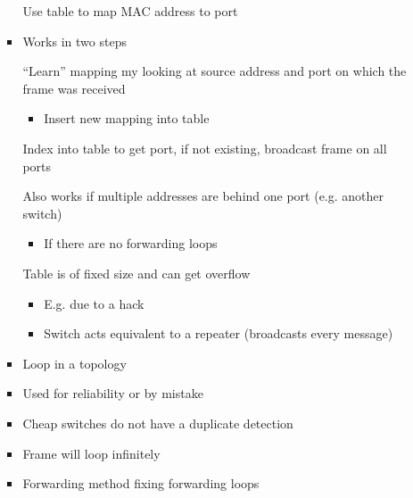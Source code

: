 \begin{itemize}
\begin{itemize}
\begin{itemize}
                     Use table to map MAC address to port
                    \item Works in two steps
                        \begin{itemize}
                             ``Learn'' mapping my looking at source address and port on which the frame was received
                                \begin{itemize}
                                    \item Insert new mapping into table
                                \end{itemize}
                             Index into table to get port, if not existing, broadcast frame on all ports
                        \end{itemize}
                    \ipro Also works if multiple addresses are behind one port (e.g. another switch)
                        \begin{itemize}
                            \item If there are no forwarding loops
                        \end{itemize}
                    \icon Table is of fixed size and can get overflow
                        \begin{itemize}
                            \item E.g. due to a hack
                            \item Switch acts equivalent to a repeater (broadcasts every message)
                        \end{itemize}
                \end{itemize}
                \begin{itemize}
                    \item Loop in a topology
                    \item Used for reliability or by mistake
                    \item Cheap switches do not have a duplicate detection
                    \item Frame will loop infinitely
                \end{itemize}
                \begin{itemize}
                    \item Forwarding method fixing forwarding loops
                        \begin{itemize}

\end{itemize}
\end{itemize}
\end{itemize}
\end{itemize}
